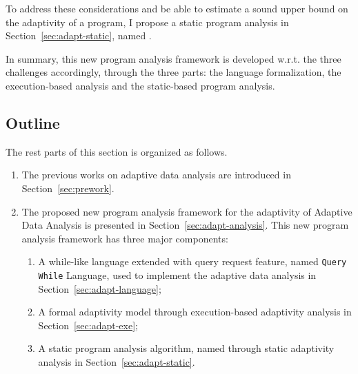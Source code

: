 \begin{enumerate}
To address these considerations and be able to estimate a sound upper bound on the adaptivity of a program, 
I propose a static program analysis in Section~\ref{sec:adapt-static}, named {\THESYSTEM}.
\end{enumerate}

In summary, this new program analysis framework is
developed w.r.t. the three challenges accordingly,
through the three parts:
the language formalization,
the execution-based analysis and the static-based program analysis.


\subsection{Outline}
\label{sec:adapt-outline}
The rest parts of this section is organized as follows. 
\begin{enumerate}
   \item The previous works on adaptive data analysis are introduced in Section~\ref{sec:prework}.
   \item The proposed new program analysis framework for the adaptivity of Adaptive Data Analysis is presented 
   in Section~\ref{sec:adapt-analysis}.
   This new program analysis framework has three major components:
   \begin{enumerate}
      \item A while-like language extended with query request feature, named {\tt Query While} Language, 
      used to implement the adaptive data analysis in Section~\ref{sec:adapt-language};
      \item A formal adaptivity model through execution-based adaptivity analysis in Section~\ref{sec:adapt-exe};
      \item A static program analysis algorithm, named {\THESYSTEM} through static adaptivity analysis in Section~\ref{sec:adapt-static}.
   \end{enumerate}
\end{enumerate}